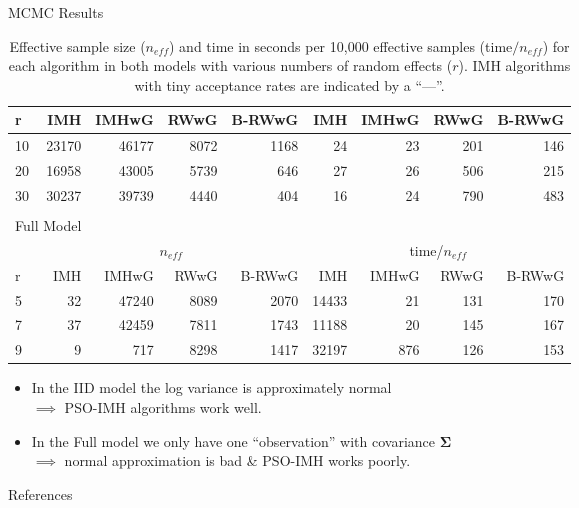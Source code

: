 \documentclass[svgnames, final]{beamer} %
\begin{document}
\begin{frame}{}
\begin{columns}[T]
\begin{column}{0.32\textwidth}
\begin{block}{\large MCMC Results}
\begin{table}[ht]
\begin{tabular}{|l|rrrr|rrrr|}
            \hline
            r  & IMH & IMHwG & RWwG & B-RWwG & IMH & IMHwG & RWwG & B-RWwG \\ 
            \hline
            10 & 23170 & 46177 & 8072 & 1168 & 24 & 23 & 201 & 146 \\ 
            20 & 16958 & 43005 & 5739 & 646 & 27 & 26 & 506 & 215 \\ 
            30 & 30237 & 39739 & 4440 & 404 & 16 & 24 & 790 & 483 \\ 
            \hline
            \multicolumn{9}{c}{}\\
            \multicolumn{2}{c}{Full Model} & \multicolumn{7}{c}{}\\
            \multicolumn{1}{c}{} &\multicolumn{4}{c}{$n_{eff}$}&\multicolumn{4}{c}{time/$n_{eff}$}\\
            \hline
            r & IMH & IMHwG & RWwG & B-RWwG & IMH & IMHwG & RWwG & B-RWwG \\ 
            \hline
            5 & 32 & 47240 & 8089 & 2070 & 14433 & 21 & 131 & 170 \\ 
            7 & 37 & 42459 & 7811 & 1743 & 11188 & 20 & 145 & 167 \\ 
            9 & 9 & 717 & 8298 & 1417 & 32197 & 876 & 126 & 153 \\ 
            \hline
          \end{tabular}
          \caption*{Effective sample size ($n_{eff}$) and time in seconds per 10,000 effective samples (time$/n_{eff}$) for each algorithm in both models with various numbers of random effects ($r$). IMH algorithms with tiny acceptance rates are indicated by a ``---''.}
        \end{table}
        \begin{itemize}\setlength{\itemsep0.5em}
          \item In the IID model the log variance is approximately normal\\ $\implies$ PSO-IMH algorithms work well.
          \item In the Full model we only have one ``observation'' with covariance $\bm{\Sigma}$\\ $\implies$ normal approximation is bad \& PSO-IMH works poorly.
        \end{itemize}
      \end{block}
      \vfill
      \begin{block}{\large References}
        {\tiny
          \nocite{*} %
        }
      \end{block}
      \vfill
    \end{column}
  \end{columns}
\end{frame}
\end{document}
